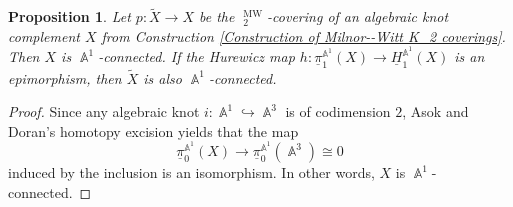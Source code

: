 \documentclass[english]{amsart}
\newtheorem{prop}{Proposition}[section]
\theoremstyle{definition}
\DeclareMathOperator{\A}{\mathbb{A}}
\DeclareMathOperator{\KK}{\underline{K}}
\DeclareMathOperator{\MW}{MW}
\begin{document}
\begin{prop}\label{knot complements connected}
Let $p \colon \widetilde{X} \rightarrow X$ be the $\KK^{\MW}_2$-covering of an algebraic knot complement $X$ from Construction \ref{Construction of Milnor--Witt K_2 coverings}. Then $X$ is $\A^1$-connected. If the Hurewicz map $h \colon \underline{\pi}_1^{\A^1}\!(X)\to \underline{H}_1^{\A^1}\!(X)$ is an epimorphism, then $\widetilde{X}$ is also $\A^1$-connected.
\end{prop}
\begin{proof}
Since any algebraic knot $i \colon \A^1 \hookrightarrow \A^3$ is of codimension $2$, Asok and Doran's homotopy excision \cite[Theorem~4.1]{asok:doran:excision} yields that the map
$$\underline{\pi}_0^{\A^1}\!(X) \to \underline{\pi}_0^{\A^1}\!(\A^3) \cong 0$$
induced by the inclusion is an isomorphism. In other words, $X$ is $\A^1$-connected.

\hfill


\end{proof}
\end{document}
